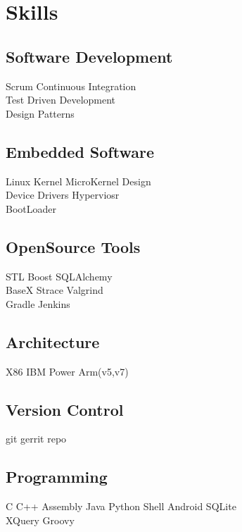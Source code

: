\documentclass[letterpaper]{deedy-resume} %
\begin{document}
\begin{minipage}[t]{0.33\textwidth} %

\section{Skills}

\subsection{Software Development}
Scrum \textbullet{} Continuous Integration \textbullet{} \\
Test Driven Development \textbullet{} \\
Design Patterns

\subsection{Embedded Software}
Linux Kernel \textbullet{} MicroKernel Design \textbullet{} \\
Device Drivers \textbullet{} Hyperviosr \textbullet{} \\
BootLoader

\subsection{OpenSource Tools}
STL \textbullet{} Boost \textbullet SQLAlchemy \textbullet \\
BaseX \textbullet{} Strace \textbullet{} Valgrind \textbullet{} \\
Gradle \textbullet{} Jenkins

\subsection{Architecture}
X86 \textbullet{} IBM Power \textbullet{} Arm(v5,v7)

\subsection{Version Control}
git \textbullet{} gerrit \textbullet{} repo

\subsection{Programming}
C \textbullet{} C++ \textbullet{} Assembly \textbullet{} Java \textbullet{} Python
Shell \textbullet{} Android \textbullet{} SQLite \textbullet \\
XQuery \textbullet{} Groovy


\end{minipage}
\end{document}
